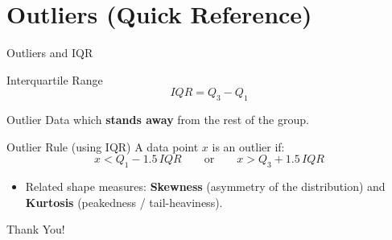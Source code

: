 \documentclass[9pt,aspectratio=169]{beamer}
\begin{document}
\section{Outliers (Quick Reference)}

\begin{frame}{Outliers and IQR }
\begin{block}{Interquartile Range}
$$IQR = Q_3 - Q_1$$
\end{block}
\begin{alertblock}{Outlier}
Data which \textbf{stands away} from the rest of the group.
\end{alertblock}
\begin{block}{Outlier Rule (using IQR)}
A data point $x$ is an outlier if:
$$x < Q_1 - 1.5\,IQR \qquad \text{or} \qquad x > Q_3 + 1.5\,IQR$$
\end{block}
\begin{itemize}
\item Related shape measures: \textbf{Skewness} (asymmetry of the distribution) and \textbf{Kurtosis} (peakedness / tail-heaviness).
\end{itemize}
\end{frame}

\begin{frame}
\centering
\Huge Thank You!
\end{frame}
\end{document}
